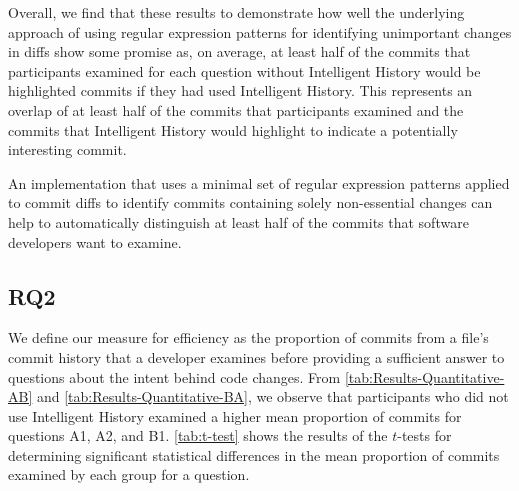Overall, we find that these results to demonstrate how well the underlying approach of using regular expression
patterns for identifying unimportant changes in diffs show some promise as, on average,
at least half of the commits that participants examined for each question without Intelligent History
would be highlighted commits if they had used Intelligent History.
This represents an overlap of at least half of the commits that participants examined and the commits
that Intelligent History would highlight to indicate a potentially interesting commit.

\begin{summary}[RQ1]
  An implementation that uses a minimal set of regular expression patterns 
  applied to commit diffs to identify commits containing solely non-essential changes can help to
  automatically distinguish at least half of the commits that software
  developers want to examine.
\end{summary}


\subsection{RQ2}
\label{subsec:RQ2}


We define our measure for efficiency as the proportion of commits from a file's commit history 
that a developer examines before providing a sufficient answer to questions about the intent behind code changes.
From \autoref{tab:Results-Quantitative-AB} and \autoref{tab:Results-Quantitative-BA}, 
we observe that participants who did not use Intelligent History 
examined a higher mean proportion of commits for questions A1, A2, and B1.
\autoref{tab:t-test} shows the results of the $t$-tests for determining significant statistical differences in 
the mean proportion of commits examined by each group for a question.


